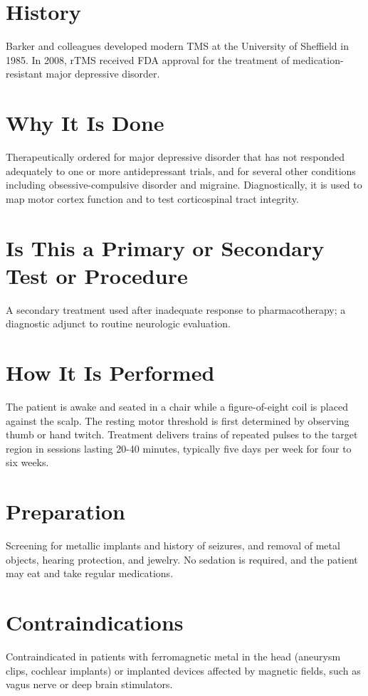 \section*{History}
Barker and colleagues developed modern TMS at the University of Sheffield in 1985. In 2008, rTMS received FDA approval for the treatment of medication-resistant major depressive disorder.

\section*{Why It Is Done}
Therapeutically ordered for major depressive disorder that has not responded adequately to one or more antidepressant trials, and for several other conditions including obsessive-compulsive disorder and migraine. Diagnostically, it is used to map motor cortex function and to test corticospinal tract integrity.

\section*{Is This a Primary or Secondary Test or Procedure}
A secondary treatment used after inadequate response to pharmacotherapy; a diagnostic adjunct to routine neurologic evaluation.

\section*{How It Is Performed}
The patient is awake and seated in a chair while a figure-of-eight coil is placed against the scalp. The resting motor threshold is first determined by observing thumb or hand twitch. Treatment delivers trains of repeated pulses to the target region in sessions lasting 20-40 minutes, typically five days per week for four to six weeks.

\section*{Preparation}
Screening for metallic implants and history of seizures, and removal of metal objects, hearing protection, and jewelry. No sedation is required, and the patient may eat and take regular medications.

\section*{Contraindications}
Contraindicated in patients with ferromagnetic metal in the head (aneurysm clips, cochlear implants) or implanted devices affected by magnetic fields, such as vagus nerve or deep brain stimulators.

